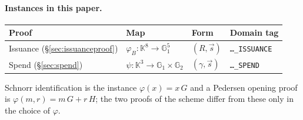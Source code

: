 \documentclass[10pt,a5paper]{article}
\newcommand{\tabsize}{\small}\newcommand{\legendsize}{\footnotesize}
\newcommand{\tabsize}{}\newcommand{\legendsize}{\small}
\newcommand{\K}[1]{#1}                      %
\newcommand{\Go}[1]{#1}                     %
\newcommand{\K}[1]{{\color{ScalarCol}#1}}   %
\newcommand{\Go}[1]{{\color{GoneCol}#1}}    %
\newcommand{\F}{\mathbb{K}}
\newcommand{\GG}[1]{\mathbb{G}_{#1}}
\newcommand{\vv}[1]{\vec{#1}}
\begin{document}
\paragraph{Instances in this paper.}
\begin{center}
\tabsize
\begin{tabular}{@{}llll@{}}
\toprule
Proof & Map & Form & Domain tag \\
\midrule
Issuance (\S\ref{sec:issuanceproof}) & $\varphi_{\Go{B}} : \F^8 \to \GG{1}^5$ & $(R,\vv{s})$ & \texttt{\ldots\_ISSUANCE} \\
Spend (\S\ref{sec:spend}) & $\psi : \F^3 \to \GG{1}\times\GG{2}$ & $(\K{\gamma},\vv{s})$ & \texttt{\ldots\_SPEND} \\
\bottomrule
\end{tabular}
\end{center}
Schnorr identification is the instance $\varphi(x) = x\,\Go{G}$ and a Pedersen
opening proof is $\varphi(m,r) = m\,\Go{G} + r\,\Go{H}$; the two proofs of the
scheme differ from these only in the choice of $\varphi$.
\end{document}
